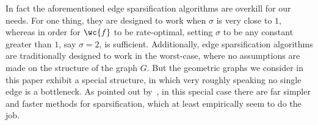 \documentclass[aos]{imsart}
\theoremstyle{plain}
\theoremstyle{definition}
\theoremstyle{remark}
\newcommand{\1}{\mathbf{1}}
\begin{document}
In fact the aforementioned edge sparsification algorithms are overkill for our needs. For one thing, they are designed to work when $\sigma$ is very close to $1$, whereas in order for $\wc{f}$ to be rate-optimal, setting $\sigma$ to be any constant greater than $1$, say $\sigma = 2$, is sufficient. Additionally, edge sparsification algorithms are traditionally designed to work in the worst-case, where no assumptions are made on the structure of the graph $G$. But the geometric graphs we consider in this paper exhibit a special structure, in which very roughly speaking no single edge is a bottleneck. As pointed out by~\citet{sadhanala16b}, in this special case there are far simpler and faster methods for sparsification, which at least empirically seem to do the job.



\end{document}
